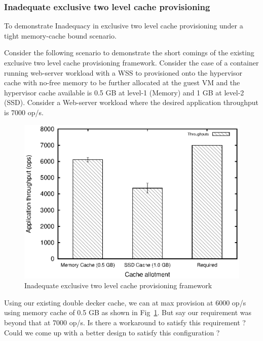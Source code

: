 	\subsubsection{Inadequate exclusive two level cache provisioning}
	\label{sec:dd_hybrid_motivation}
	  
	    To demonstrate Inadequacy in exclusive two level cache provisioning under a tight memory-cache bound
	    scenario.  
	    
	    Consider the following scenario to demonstrate the short comings of the existing exclusive two level cache
	    provisioning framework. Consider the case of a container running web-server workload
	    with a WSS to provisioned onto the hypervisor cache with  no-free memory to be further allocated 
	    at the guest VM and the hypervisor cache available is 0.5 GB at level-1 (Memory) and 1 GB at 
	    level-2 (SSD). Consider a Web-server workload where the desired application throughput is 7000 op/s.
	    
	  \begin{figure}
	    \centering
	    \includegraphics[scale=0.8]{images/dd_hybrid_motivation/throughput.eps}
	    \caption{Inadequate exclusive two level cache provisioning framework}
	    \label{plot:dd_hybrid_motivation}
	  \end{figure}
	  
	    Using our existing double decker cache, we can at max provision at 6000 op/s using memory cache of 0.5 GB as 
	    shown in Fig~\ref{plot:dd_hybrid_motivation}. But say our requirement was beyond that at 7000 op/s. Is there a 
	    workaround to satisfy this requirement ? Could we come up with a better design to satisfy this configuration ?
	    
